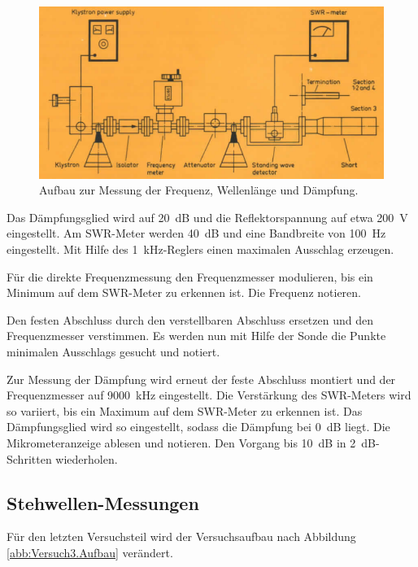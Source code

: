 \FloatBarrier
\begin{figure}
   \centering
  \includegraphics[scale=0.3]{Versuch2.Aufbau.png}
  \caption{Aufbau zur Messung der Frequenz, Wellenlänge und Dämpfung. \cite{Q1}}
  \label{abb:Versuch2.Aufbau}
\end{figure}
\FloatBarrier

Das Dämpfungsglied wird auf \SI{20}{\dB} und die Reflektorspannung auf etwa
\SI{200}{\volt} eingestellt. Am SWR-Meter werden \SI{40}{\dB} und eine Bandbreite von
\SI{100}{\hertz} eingestellt. Mit Hilfe des \SI{1}{\kilo\hertz}-Reglers einen
maximalen Ausschlag erzeugen.

Für die direkte Frequenzmessung den Frequenzmesser modulieren, bis ein Minimum
auf dem SWR-Meter zu erkennen ist. Die Frequenz notieren.

Den festen Abschluss durch den verstellbaren Abschluss ersetzen und den
Frequenzmesser verstimmen. Es werden nun mit Hilfe der Sonde die Punkte
minimalen Ausschlags gesucht und notiert.

Zur Messung der Dämpfung wird erneut der feste Abschluss montiert und der
Frequenzmesser auf \SI{9000}{\kilo\hertz} eingestellt. Die Verstärkung des
SWR-Meters wird so variiert, bis ein Maximum auf dem SWR-Meter zu erkennen ist.
Das Dämpfungsglied wird so eingestellt, sodass die Dämpfung bei \SI{0}{\dB}
liegt. Die Mikrometeranzeige ablesen und notieren. Den Vorgang bis \SI{10}{\dB}
in \SI{2}{\dB}-Schritten wiederholen.

\subsection{Stehwellen-Messungen}

Für den letzten Versuchsteil wird der Versuchsaufbau nach Abbildung
\ref{abb:Versuch3.Aufbau} verändert.


